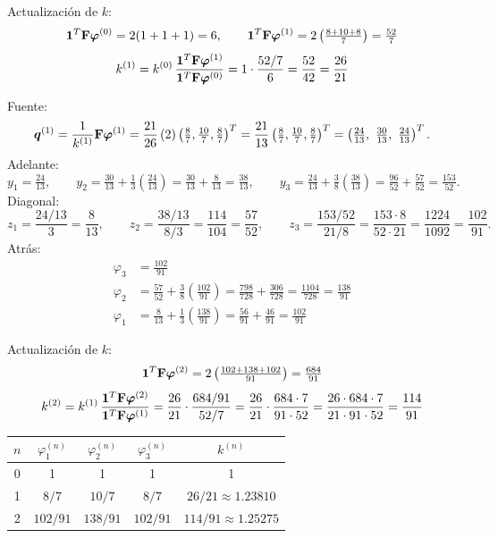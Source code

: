 Actualización de $k$:
\[
\bm{1}^T\mathbf{F}\bm{\varphi}^{(0)} = 2(1 + 1 + 1) = 6,\qquad
\bm{1}^T\mathbf{F}\bm{\varphi}^{(1)} = 2\left(\tfrac{8 + 10 + 8}{7}\right) = \tfrac{52}{7}
\]
\[
k^{(1)} = k^{(0)}\,\frac{\bm{1}^T\mathbf{F}\bm{\varphi}^{(1)}}{\bm{1}^T\mathbf{F}\bm{\varphi}^{(0)}}
= 1\cdot\frac{52/7}{6} = \frac{52}{42} = \frac{26}{21}
\]

Fuente:
\[
\bm{q}^{(1)} = \frac{1}{k^{(1)}}\mathbf{F}\bm{\varphi}^{(1)}
= \frac{21}{26}\,(2)\left(\tfrac87, \tfrac{10}{7}, \tfrac87\right)^T
= \frac{21}{13}\left(\tfrac87, \tfrac{10}{7}, \tfrac87\right)^T
= \left(\tfrac{24}{13},\ \tfrac{30}{13},\ \tfrac{24}{13}\right)^T .
\]
Adelante:
\[
y_1 = \tfrac{24}{13},\qquad
y_2 = \tfrac{30}{13} + \tfrac13\left(\tfrac{24}{13}\right) = \tfrac{30}{13} + \tfrac{8}{13} = \tfrac{38}{13},\qquad
y_3 = \tfrac{24}{13} + \tfrac38\left(\tfrac{38}{13}\right) = \tfrac{96}{52} + \tfrac{57}{52} = \tfrac{153}{52} .
\]
Diagonal:
\[
z_1 = \frac{24/13}{3} = \frac{8}{13},\qquad
z_2 = \frac{38/13}{8/3} = \frac{114}{104} = \frac{57}{52},\qquad
z_3 = \frac{153/52}{21/8} = \frac{153\cdot 8}{52\cdot 21} = \frac{1224}{1092} = \frac{102}{91} .
\]
Atrás:
\begin{align*}
	\varphi_3 &= \tfrac{102}{91}\\
	\varphi_2 &= \tfrac{57}{52} + \tfrac38\left(\tfrac{102}{91}\right) = \tfrac{798}{728} + \tfrac{306}{728}
	= \tfrac{1104}{728} = \tfrac{138}{91}\\
	\varphi_1 &= \tfrac{8}{13} + \tfrac13\left(\tfrac{138}{91}\right) = \tfrac{56}{91} + \tfrac{46}{91} = \tfrac{102}{91}
\end{align*}


Actualización de $k$:
\[
\bm{1}^T\mathbf{F}\bm{\varphi}^{(2)} = 2\left(\tfrac{102 + 138 + 102}{91}\right) = \tfrac{684}{91}
\]
\[
k^{(2)} = k^{(1)}\,\frac{\bm{1}^T\mathbf{F}\bm{\varphi}^{(2)}}{\bm{1}^T\mathbf{F}\bm{\varphi}^{(1)}}
= \frac{26}{21}\cdot\frac{684/91}{52/7} = \frac{26}{21}\cdot\frac{684\cdot 7}{91\cdot 52}
= \frac{26\cdot 684\cdot 7}{21\cdot 91\cdot 52} = \frac{114}{91}
\]

\begin{center}
	\begin{tabular}{ccccc}\toprule
		$n$ & $\varphi_1^{(n)}$ & $\varphi_2^{(n)}$ & $\varphi_3^{(n)}$ & $k^{(n)}$\\\midrule
		0 & 1 & 1 & 1 & 1\\
		1 & $8/7$ & $10/7$ & $8/7$ & $26/21 \approx 1.23810$\\
		2 & $102/91$ & $138/91$ & $102/91$ & $114/91 \approx 1.25275$\\\bottomrule
	\end{tabular}
\end{center}


